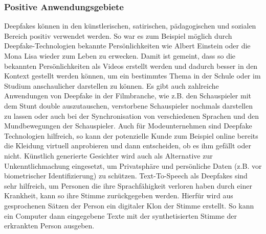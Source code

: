 \subsubsection{Positive Anwendungsgebiete}
Deepfakes können in den künstlerischen, satirischen, pädagogischen und sozialen Bereich positiv verwendet werden.\newline
So war es zum Beispiel möglich durch Deepfake-Technologien bekannte Persönlichkeiten wie Albert Einstein oder die Mona Lisa wieder zum Leben zu erwecken. Damit ist gemeint, dass so die bekannten Persönlichkeiten als Videos erstellt werden und dadurch besser in den Kontext gestellt werden können, um ein bestimmtes Thema in der Schule oder im Studium anschaulicher darstellen zu können.\newline
Es gibt auch zahlreiche Anwendungen von Deepfake in der Filmbranche, wie z.B. den Schauspieler mit dem Stunt double auszutauschen, verstorbene Schauspieler nochmals darstellen zu lassen oder auch bei der Synchronisation von verschiedenen Sprachen und den Mundbewegungen der Schauspieler.
Auch für Modeunternehmen sind Deepfake Technologien hilfreich, so kann der potenzielle Kunde zum Beispiel online bereits die Kleidung virtuell anprobieren und dann entscheiden, ob es ihm gefällt oder nicht.\newline
Künstlich generierte Gesichter wird auch als Alternative zur Unkenntlichmachung eingesetzt, um Privatsphäre und persönliche Daten (z.B. vor biometrischer Identifizierung) zu schützen.\newline
Text-To-Speech als Deepfakes sind sehr hilfreich, um Personen die ihre Sprachfähigkeit verloren haben durch einer Krankheit, kann so ihre Stimme zurückgegeben werden. Hierfür wird aus gesprochenen Sätzen der Person ein digitaler Klon der Stimme erstellt. So kann ein Computer dann eingegebene Texte mit der synthetisierten Stimme der erkrankten Person ausgeben.\cite{SpringerLink}

